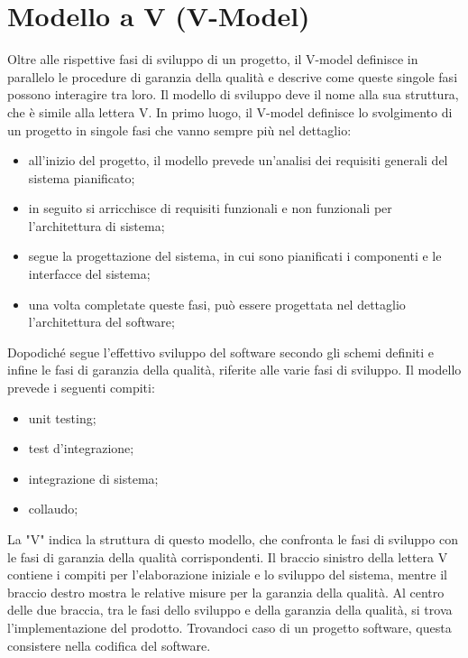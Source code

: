 \section{Modello a V (V-Model)}
Oltre alle rispettive fasi di sviluppo di un progetto, il V-model definisce in parallelo le procedure di garanzia della qualità e descrive come queste singole fasi possono interagire tra loro. Il modello di sviluppo deve il nome alla sua struttura, che è simile alla lettera V.
In primo luogo, il V-model definisce lo svolgimento di un progetto in singole fasi che vanno sempre più nel dettaglio:
\begin{itemize}
    \item all'inizio del progetto, il modello prevede un'analisi dei requisiti generali del sistema pianificato;
    \item in seguito si arricchisce di requisiti funzionali e non funzionali per l’architettura di sistema;
    \item segue la progettazione del sistema, in cui sono pianificati i componenti e le interfacce del sistema;
    \item una volta completate queste fasi, può essere progettata nel dettaglio l'architettura del software;
\end{itemize}
Dopodiché segue l’effettivo sviluppo del software secondo gli schemi definiti e infine le fasi di garanzia della qualità, riferite alle varie fasi di sviluppo. Il modello prevede i seguenti compiti:
\begin{itemize}
    \item unit testing;
    \item test d'integrazione;
    \item integrazione di sistema;
    \item collaudo;
\end{itemize}
La "V" indica la struttura di questo modello, che confronta le fasi di sviluppo con le fasi di garanzia della qualità corrispondenti. Il braccio sinistro della lettera V contiene i compiti per l'elaborazione iniziale e lo sviluppo del sistema, mentre il braccio destro mostra le relative misure per la garanzia della qualità. Al centro delle due braccia, tra le fasi dello sviluppo e della garanzia della qualità, si trova l'implementazione del prodotto. Trovandoci caso di un progetto software, questa consistere nella codifica del software.

